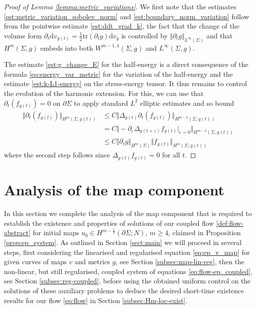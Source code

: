 \documentclass[10pt,reqno]{amsart}
\theoremstyle{plain}
\theoremstyle{definition}
\numberwithin{equation}{section}
\newcommand{\Si}{\Sigma}
\newcommand{\norm}[1]{\Vert#1\Vert}
\newcommand{\beqa}{\begin{equation}\begin{aligned}}
\newcommand{\eeqa}{\end{aligned}\end{equation}}
\newcommand{\half}{\frac{1}{2}}
\newcommand{\dd}{\mathrm{d}} %
\newcommand{\pt}{\partial_t}
\newcommand{\eps}{\varepsilon}
\newcommand{\pSi}{{\partial \Sigma}}
\newcommand{\hf}{\frac{1}{2}} %
\newcommand{\p}{\partial} %
\begin{document}
\begin{proof}[Proof of Lemma \ref{lemma:metric_variations}]
    We first note that the estimates \eqref{est:metric_variation_sobolev_norm} and \eqref{est:boundary_norm_variation} follow from the pointwise estimate \eqref{est:ddt_grad_k}, the fact that the change of the volume form $ \p_t \dd v_{g(t)} = \hf\mathrm{tr}(\p_t g)\dd v_g$  is controlled by $\norm{\pt g}_{L^\infty(\Si)}$ and that $H^m(\Si,g)$ embeds into both $W^{m-1,4}(\Si,g)$ and $L^\infty(\Si,g)$. 
   
    The estimate \eqref{est:g_change_E} for the half-energy is a direct consequence of the  formula \eqref{eq:energy_var_metric} for the variation of the half-energy and the estimate  \eqref{est:k-L1-energy} on the stress-energy tensor. It thus remains to control the evolution of the harmonic extension. For this, we can use that $\p_t (f_{g(t)}) = 0$ on $\p\Si$ to apply standard $L^2$ elliptic estimates and so bound
    \beqa
		\norm{\p_t (f_{g(t)})}_{H^m(\Si,g(t))}& \leq C\norm{\Delta_{g(t)} \p_t (f_{g(t)})}_{H^{m-2}(\Si,g(t))}\\
        &= C\norm{-\p_\eps \Delta_{g(t+\eps)} f_{g(t)} \big|_{\eps=0}}_{H^{m-2}(\Si,g(t))}\\
        & \leq  C\norm{\p_t g}_{H^{m}(\Si)}\norm{f_{g(t)}}_{H^{m}(\Si,g(t))}
	\eeqa
    where the second step follows since $\Delta_{g(t)} f_{g(t)} = 0$ for all $t$.
\end{proof}


\section{Analysis of the map component}\label{sect:map}
In this section we complete the analysis of the map component that is required to establish the existence and properties of solutions of our coupled flow \eqref{def:flow-abstract} for initial maps $u_0\in H^{m-\half}(\pSi;N)$, $m\geq 4$, claimed in Proposition \ref{prop:ep_system}. As outlined in Section \ref{sect:main} we will proceed in several steps, first considering the linearised and regularised equation \eqref{eq:ep_v_map} for given curves of maps $v$ and metrics $g$, see Section \ref{subsec:map-lin-reg}, then the non-linear, but still regularised, coupled system of equations \eqref{eq:flow-ep_coupled}, see Section \ref{subsec:reg-coupled},  before using the obtained uniform control on the solutions of these auxiliary problems to deduce the desired short-time existence results for our flow \eqref{eq:flow} in Section \ref{subsec:Hm-loc-exist}. 
\end{document}
